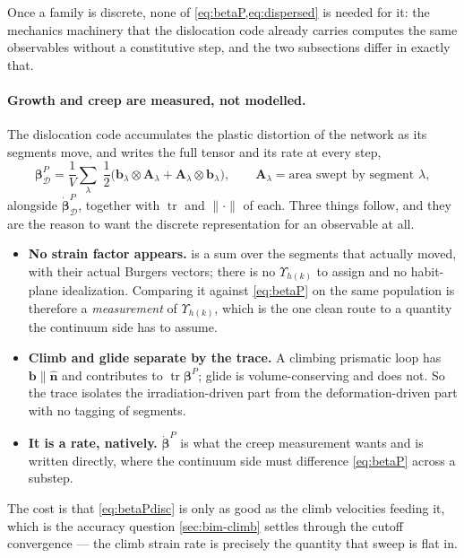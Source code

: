 \documentclass{article}
\newcommand{\bvec}{\bm b}
\begin{document}
Once a family is discrete, none of \cref{eq:betaP,eq:dispersed} is needed for it:
the mechanics machinery that the dislocation code already carries computes the
same observables without a constitutive step, and the two subsections differ in
exactly that.

\paragraph{Growth and creep are measured, not modelled.} The dislocation code
accumulates the plastic distortion of the network as its segments move, and
writes the full tensor and its rate at every step,
\begin{equation}
  \bm\beta^{P}_{\mathcal D}
   =\frac{1}{V}\sum_{\lambda}\;\frac{1}{2}\bigl(\bvec_\lambda\otimes\bm A_\lambda
        +\bm A_\lambda\otimes\bvec_\lambda\bigr),
  \qquad
  \bm A_\lambda=\text{area swept by segment }\lambda,
  \label{eq:betaPdisc}
\end{equation}
alongside $\dot{\bm\beta}^{P}_{\mathcal D}$, together with $\operatorname{tr}$ and
$\|\cdot\|$ of each. Three things follow, and they are the reason to want the
discrete representation for an observable at all.

\begin{itemize}
\item \textbf{No strain factor appears.}  is a sum over the
      segments that actually moved, with their actual Burgers vectors; there is
      no $\Upsilon_{h(k)}$ to assign and no habit-plane idealization. Comparing
      it against \cref{eq:betaP} on the same population is therefore a
      \emph{measurement} of $\Upsilon_{h(k)}$, which is the one clean route to a
      quantity the continuum side has to assume.
\item \textbf{Climb and glide separate by the trace.} A climbing prismatic loop
      has $\bvec\parallel\hat{\bm n}$ and contributes to
      $\operatorname{tr}\bm\beta^{P}$; glide is volume-conserving and does not. So
      the trace isolates the irradiation-driven part from the deformation-driven
      part with no tagging of segments.
\item \textbf{It is a rate, natively.} $\dot{\bm\beta}^{P}$ is what the creep
      measurement wants and is written directly, where the continuum side must
      difference \cref{eq:betaP} across a substep.
\end{itemize}

The cost is that \cref{eq:betaPdisc} is only as good as the climb velocities
feeding it, which is the accuracy question \cref{sec:bim-climb} settles through
the cutoff convergence --- the climb strain rate is precisely the quantity that
sweep is flat in.
\end{document}

